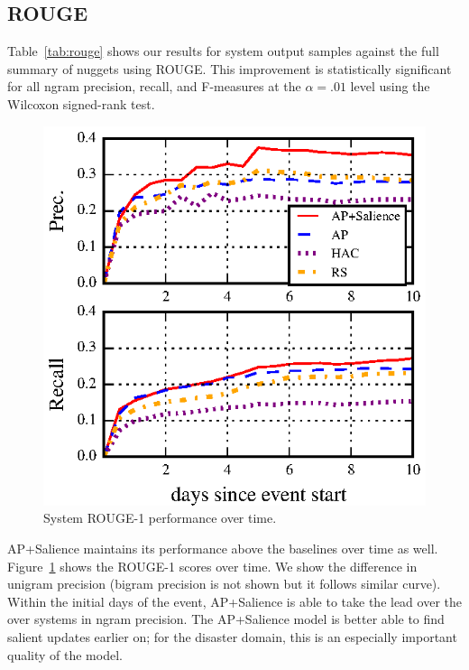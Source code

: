 
\subsection{ROUGE}


Table~\ref{tab:rouge} shows our results for system output samples against the full summary of nuggets using ROUGE. 
This improvement is statistically significant for all ngram
precision, recall, and F-measures
at the $\alpha = .01$ level
using the Wilcoxon signed-rank test. 

\begin{figure}
    \includegraphics[]{rouge-time.eps}
\caption{System ROUGE-1 performance over time.}
\label{fig:trouge}
\vspace{-14pt}
\end{figure}


AP+Salience maintains its performance above the baselines over time as well. Figure~\ref{fig:trouge}
shows the ROUGE-1 scores over time. 
We show the difference in unigram precision (bigram precision is not shown but it follows
similar curve).
Within the initial days of the event, AP+Salience is able to take the lead over the over 
systems in ngram precision. 
The AP+Salience model is better able to find salient updates
earlier on; for the disaster domain, this is an especially important quality of the model. 

